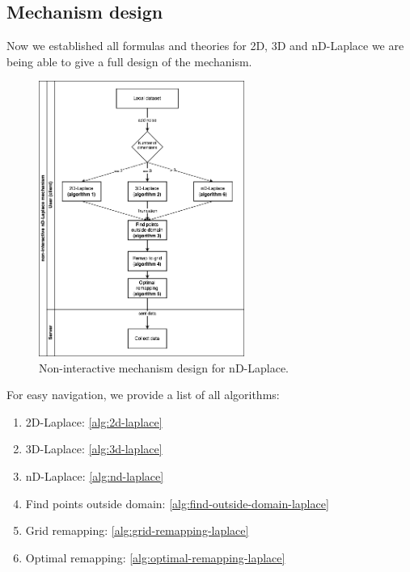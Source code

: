\subsection{Mechanism design}
Now we established all formulas and theories for 2D, 3D and nD-Laplace we are being able to give a full design of the mechanism.

\begin{figure}[H]
    \includegraphics[width=0.6\textwidth]{TheorethicalFramework/ND-Laplace/Images/final_mechanism_design.png}
    \caption{Non-interactive mechanism design for nD-Laplace.}
    \label{fig:final-mechanism-design}
\end{figure}

For easy navigation, we provide a list of all algorithms:
\begin{enumerate}
    \item 2D-Laplace:  \ref{alg:2d-laplace}
    \item 3D-Laplace: \ref{alg:3d-laplace}
    \item nD-Laplace: \ref{alg:nd-laplace}
    \item Find points outside domain: \ref{alg:find-outside-domain-laplace}
    \item Grid remapping: \ref{alg:grid-remapping-laplace}
    \item Optimal remapping: \ref{alg:optimal-remapping-laplace}
\end{enumerate}
